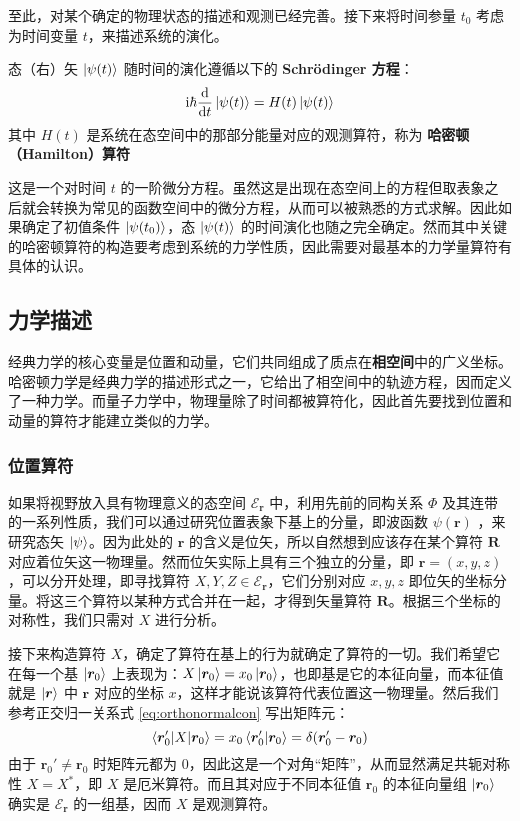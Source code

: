 \documentclass[cn,10pt,math=newtx,citestyle=gb7714-2015,bibstyle=gb7714-2015]{elegantbook}
\def\bm{\boldsymbol}
\def\bf{\textbf}
\def\ms{\mathscr}
\def\d{\mathrm d}
\def\i{\mathrm i}
\begin{document}
至此，对某个确定的物理状态的描述和观测已经完善。接下来将时间参量 $t_0$ 考虑为时间变量 $t$，来描述系统的演化。

\begin{postulate}\label{pos:Seq} 
   态（右）矢 $\ket{\psi(t)}$ 随时间的演化遵循以下的 \bf{Schrödinger 方程}：
   \begin{equation}
      \i\hbar\frac{\d}{\d t}\ket{\psi(t)}=H(t)\ket{\psi(t)}
   \end{equation}
   其中 $H(t)$ 是系统在态空间中的那部分能量对应的观测算符，称为 \bf{哈密顿（Hamilton）算符}
   
\end{postulate}

这是一个对时间 $t$ 的一阶微分方程。虽然这是出现在态空间上的方程但取表象之后就会转换为常见的函数空间中的微分方程，从而可以被熟悉的方式求解。因此如果确定了初值条件 $\ket{\psi(t_0)}$，态 $\ket{\psi(t)}$ 的时间演化也随之完全确定。然而其中关键的哈密顿算符的构造要考虑到系统的力学性质，因此需要对最基本的力学量算符有具体的认识。

\subsection{力学描述}

经典力学的核心变量是位置和动量，它们共同组成了质点在\textbf{相空间}中的广义坐标。哈密顿力学是经典力学的描述形式之一，它给出了相空间中的轨迹方程，因而定义了一种力学。而量子力学中，物理量除了时间都被算符化，因此首先要找到位置和动量的算符才能建立类似的力学。

\subsubsection{位置算符}
如果将视野放入具有物理意义的态空间 $\ms E_{\bm r}$ 中，利用先前的同构关系 $\Phi$ 及其连带的一系列性质，我们可以通过研究位置表象下基上的分量，即波函数 $\psi(\bm r)$ ，来研究态矢 $\ket{\psi}$。因为此处的 $\bm r$ 的含义是位矢，所以自然想到应该存在某个算符 $\bm R$ 对应着位矢这一物理量。然而位矢实际上具有三个独立的分量，即 $\bm r=(x,y,z)$，可以分开处理，即寻找算符 $X,Y,Z\in\ms E_{\bm r}$，它们分别对应 $x,y,z$ 即位矢的坐标分量。将这三个算符以某种方式合并在一起，才得到矢量算符 $\bm R$。根据三个坐标的对称性，我们只需对 $X$ 进行分析。

接下来构造算符 $X$，确定了算符在基上的行为就确定了算符的一切。我们希望它在每一个基 $\ket{\bm r_0}$ 上表现为：$X\ket{\bm r_0}=x_0\ket{\bm r_0}$，也即基是它的本征向量，而本征值就是 $\ket{\bm r}$ 中 $\bm r$ 对应的坐标 $x$，这样才能说该算符代表位置这一物理量。然后我们参考正交归一关系式 \ref{eq:orthonormalcon} 写出矩阵元：
\begin{equation}
   \braket{\bm r_0'|X|\bm r_0}=x_0\braket{\bm r_0'|\bm r_0}=\delta(\bm r_0'-\bm r_0)
\end{equation}
由于 $\bm r_0'\ne\bm r_0$ 时矩阵元都为 $0$，因此这是一个对角“矩阵”，从而显然满足共轭对称性 $X=X^*$，即 $X$ 是厄米算符。而且其对应于不同本征值 $\bm r_0$ 的本征向量组 $\ket{\bm r_0}$ 确实是 $\ms E_{\bm r}$ 的一组基，因而 $X$ 是观测算符。
\end{document}

